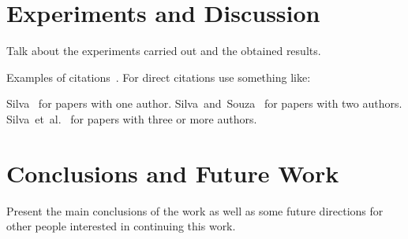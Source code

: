 \documentclass[10pt,twocolumn,letterpaper]{article}
\newcommand{\CITEONE}[2]{\mbox{#1 \cite{#2}}}
\newcommand{\CITETWO}[3]{\mbox{#1 and #2 \cite{#3}}}
\newcommand{\CITEN}[2]{\mbox{#1 et al. \cite{#2}}}
\begin{document}
\section{Experiments and Discussion}
Talk about the experiments carried out and the obtained results. 

Examples of citations~\cite{Ni_2008, Ni_2009}. For direct citations use something like: 

\CITEONE{Silva}{Silva_2010} for papers with one author.
\CITETWO{Silva}{Souza}{Silva_2010b} for papers with two authors.
\CITEN{Silva}{Silva_2010c} for papers with three or more authors.

\section{Conclusions and Future Work}
Present the main conclusions of the work as well as some future directions for other people interested in continuing this work. 

{\small


}
\end{document}
